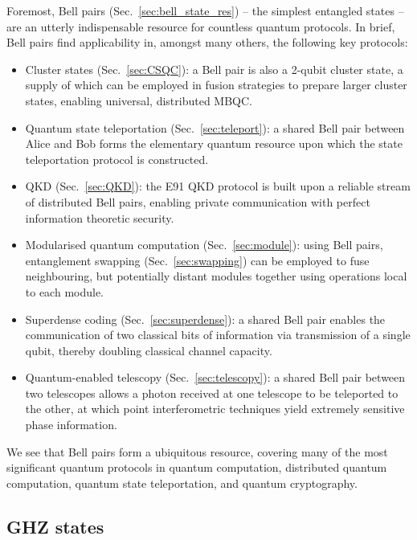 Foremost, Bell pairs (Sec.~\ref{sec:bell_state_res}) -- the simplest entangled states -- are an utterly indispensable resource for countless quantum protocols. In brief, Bell pairs find applicability in, amongst many others, the following key protocols:
\begin{itemize}
\item Cluster states (Sec.~\ref{sec:CSQC}): a Bell pair is also a 2-qubit cluster state, a supply of which can be employed in fusion strategies to prepare larger cluster states, enabling universal, distributed MBQC.
\item Quantum state teleportation (Sec.~\ref{sec:teleport}): a shared Bell pair between Alice and Bob forms the elementary quantum resource upon which the state teleportation protocol is constructed.
\item QKD (Sec.~\ref{sec:QKD}): the E91 QKD protocol is built upon a reliable stream of distributed Bell pairs, enabling private communication with perfect information theoretic security.
\item Modularised quantum computation (Sec.~\ref{sec:module}): using Bell pairs, entanglement swapping (Sec.~\ref{sec:swapping}) can be employed to fuse neighbouring, but potentially distant modules together using operations local to each module.
\item Superdense coding (Sec.~\ref{sec:superdense}): a shared Bell pair enables the communication of two classical bits of information via transmission of a single qubit, thereby doubling classical channel capacity.
\item Quantum-enabled telescopy (Sec.~\ref{sec:telescopy}): a shared Bell pair between two telescopes allows a photon received at one telescope to be teleported to the other, at which point interferometric techniques yield extremely sensitive phase information.
\end{itemize}

We see that Bell pairs form a ubiquitous resource, covering many of the most significant quantum protocols in quantum computation, distributed quantum computation, quantum state teleportation, and quantum cryptography.

%
%

\subsection{GHZ states}

